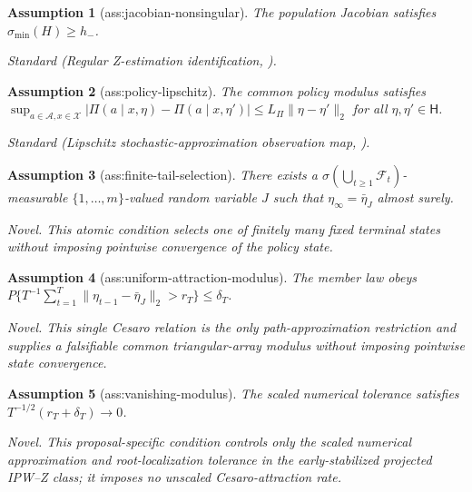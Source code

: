 \documentclass{article}
\newtheorem{assumption}{Assumption}
\begin{document}
\begin{assumption}[ass:jacobian-nonsingular]\label{ass:jacobian-nonsingular}
The population Jacobian satisfies \(\sigma_{\min}(H)\ge h_-\).
\par\smallskip\noindent\emph{Standard} (Regular Z-estimation identification, \cite{GuoXu2026MisspecifiedBandits}).
\end{assumption}

\begin{assumption}[ass:policy-lipschitz]\label{ass:policy-lipschitz}
The common policy modulus satisfies \(\sup_{a\in\mathcal A,x\in\mathcal X}|\Pi(a\mid x,\eta)-\Pi(a\mid x,\eta')|\le L_\Pi\|\eta-\eta'\|_2\) for all \(\eta,\eta'\in\mathsf H\).
\par\smallskip\noindent\emph{Standard} (Lipschitz stochastic-approximation observation map, \cite{Borkar2002LockIn}).
\end{assumption}

\begin{assumption}[ass:finite-tail-selection]\label{ass:finite-tail-selection}
There exists a \(\sigma(\bigcup_{t\ge1}\mathcal F_t)\)-measurable \(\{1,\ldots,m\}\)-valued random variable \(J\) such that \(\eta_\infty=\bar\eta_J\) almost surely.
\par\smallskip\noindent\emph{Novel.} This atomic condition selects one of finitely many fixed terminal states without imposing pointwise convergence of the policy state.
\end{assumption}

\begin{assumption}[ass:uniform-attraction-modulus]\label{ass:uniform-attraction-modulus}
The member law obeys \(P\{T^{-1}\sum_{t=1}^T\|\eta_{t-1}-\bar\eta_J\|_2>r_T\}\le\delta_T\).
\par\smallskip\noindent\emph{Novel.} This single Cesaro relation is the only path-approximation restriction and supplies a falsifiable common triangular-array modulus without imposing pointwise state convergence.
\end{assumption}

\begin{assumption}[ass:vanishing-modulus]\label{ass:vanishing-modulus}
The scaled numerical tolerance satisfies \(T^{-1/2}(r_T+\delta_T)\to0\).
\par\smallskip\noindent\emph{Novel.} This proposal-specific condition controls only the scaled numerical approximation and root-localization tolerance in the early-stabilized projected IPW--Z class; it imposes no unscaled Cesaro-attraction rate.
\end{assumption}
\end{document}
